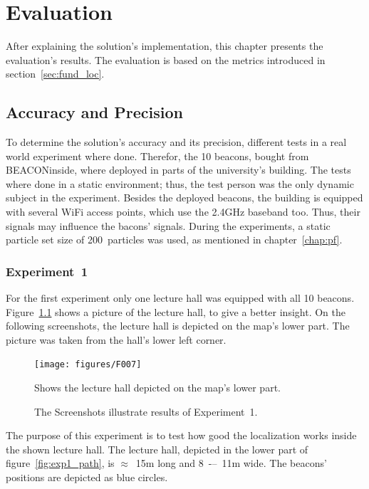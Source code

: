 \chapter{Evaluation} \label{chap:evaluation}
After explaining the solution's implementation, this chapter presents the evaluation's results. The evaluation is based on the metrics introduced in section~\ref{sec:fund_loc}.

\section{Accuracy and Precision}
To determine the solution's accuracy and its precision, different tests in a real world experiment where done. Therefor, the 10 beacons, bought from BEACONinside, where deployed in parts of the university's building. The tests where done in a static environment; thus, the test person was the only dynamic subject in the experiment. Besides the deployed beacons, the building is equipped with several WiFi access points, which use the 2.4GHz baseband too. Thus, their signals may influence the bacons' signals. During the experiments, a static particle set size of 200~particles was used, as mentioned in chapter~\ref{chap:pf}.

\subsection*{Experiment~1}
For the first experiment only one lecture hall was equipped with all 10 beacons. Figure~\ref{fig:f007} shows a picture of the lecture hall, to give a better insight. On the following screenshots, the lecture hall is depicted on the map's lower part. The picture was taken from the hall's lower left corner.

\begin{figure}
	\texttt{[image: figures/F007]}
	\caption{Shows the lecture hall depicted on the map's lower part.}
	\label{fig:f007}
\end{figure}

\begin{figure}
	
	\caption{The Screenshots illustrate results of Experiment~1.}
	\label{fig:exp1_screenshot}
\end{figure}

The purpose of this experiment is to test how good the localization works inside the shown lecture hall. The lecture hall, depicted in the lower part of figure~\ref{fig:exp1_path}, is  $\approx$~15m long and 8~-–~11m wide. The beacons' positions are depicted as blue circles.

